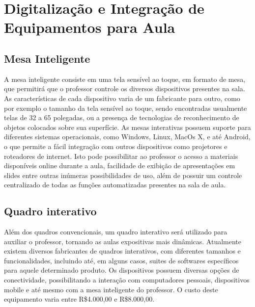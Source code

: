 \section{Digitalização e Integração de Equipamentos para Aula}

\subsection{Mesa Inteligente}

A mesa inteligente consiste em uma tela sensível ao toque, em formato de mesa, que permitirá que o professor controle os diversos dispositivos presentes na sala.
As características de cada dispositivo varia de um fabricante para outro, como por exemplo o tamanho da tela sensível ao toque, sendo encontradas usualmente telas de 32 a 65 polegadas, ou a presença de tecnologias de reconhecimento de objetos colocados sobre sua superfície. 
As mesas interativas possuem suporte para diferentes sistemas operacionais, como Windows, Linux, MacOs X, e até Android, o que permite a fácil integração com outros dispositivos como projetores e roteadores de internet. Isto pode possibilitar ao professor o acesso a materiais disponíveis online durante a aula, facilidade de exibição de apresentações em slides entre outras inúmeras possibilidades de uso, além de possuir um controle centralizado de todas as funções automatizadas presentes na sala de aula.

\subsection{Quadro interativo}

Além dos quadros convencionais, um quadro interativo será utilizado para auxiliar o professor, tornando as aulas expositivas mais dinâmicas. Atualmente existem diversos fabricantes de quadros interativos, com diferentes tamanhos e funcionalidades, incluindo até, em alguns casos, suites de softwares específicos para aquele determinado produto. Os dispositivos possuem diversas opções de conectividade, possibilitando a interação com computadores pessoais, dispositivos mobile e até mesmo com a mesa inteligente do professor. O custo deste equipamento varia entre R\$4.000,00 e R\$8.000,00.

